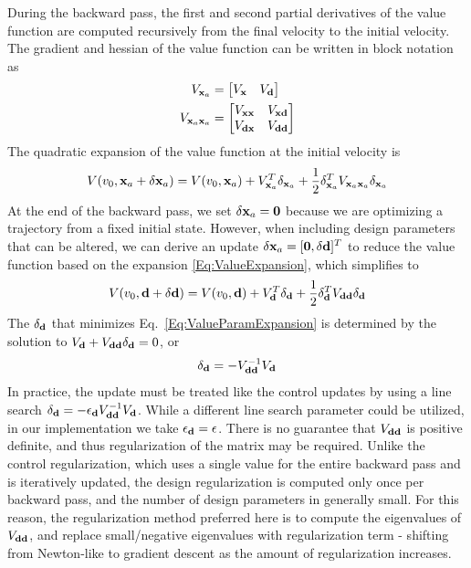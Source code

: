 During the backward pass, the first and second partial derivatives of the value function are computed recursively from the final velocity to the initial velocity. The gradient and hessian of the value function can be written in block notation as 
\begin{align}
	V_{\mathbf{x}_a} &= \begin{bmatrix}
		V_{\mathbf{x}} & V_{\mathbf{d}}
	\end{bmatrix} \\
	V_{\mathbf{x}_a\mathbf{x}_a} &= \begin{bmatrix}
		V_{\mathbf{x}\mathbf{x}} & V_{\mathbf{x}\mathbf{d}} \\
		V_{\mathbf{d}\mathbf{x}} & V_{\mathbf{d}\mathbf{d}}
	\end{bmatrix}
\end{align}
The quadratic expansion of the value function at the initial velocity is
\begin{align}
	V(v_0, \mathbf{x}_a+\delta\mathbf{x}_a) = V(v_0, \mathbf{x}_a) + V_{\mathbf{x}_a}^T\delta_{\mathbf{x}_a} + \frac{1}{2}\delta_{\mathbf{x}_a}^TV_{\mathbf{x}_a\mathbf{x}_a}\delta_{\mathbf{x}_a} \label{Eq:ValueExpansion}
\end{align}
At the end of the backward pass, we set $\delta\mathbf{x}_a=\mathbf{0}$ because we are optimizing a trajectory from a fixed initial state. However, when including design parameters that can be altered, we can derive an update $\delta\mathbf{x}_a = [\mathbf{0},\delta\mathbf{d}]^T$ to reduce the value function based on the expansion \eqref{Eq:ValueExpansion}, which simplifies to 
\begin{align}
	V(v_0, \mathbf{d}+\delta\mathbf{d}) = V(v_0, \mathbf{d}) + V_{\mathbf{d}}^T\delta_{\mathbf{d}} + \frac{1}{2}\delta_{\mathbf{d}}^TV_{\mathbf{d}\mathbf{d}}\delta_{\mathbf{d}} \label{Eq:ValueParamExpansion}
\end{align}
The $\delta_{\mathbf{d}}$ that minimizes Eq.~\eqref{Eq:ValueParamExpansion} is determined by the solution to $V_{\mathbf{d}} + V_{\mathbf{d}\mathbf{d}}\delta_{\mathbf{d}} = 0$, or 
\begin{align}
	\delta_{\mathbf{d}} = -V_{\mathbf{d}\mathbf{d}}^{-1}V_{\mathbf{d}}
\end{align}
In practice, the update must be treated like the control updates by using a line search $\delta_{\mathbf{d}} = -\epsilon_{\mathbf{d}} V_{\mathbf{d}\mathbf{d}}^{-1}V_{\mathbf{d}}$. While a different line search parameter could be utilized, in our implementation we take $\epsilon_{\mathbf{d}}=\epsilon$. There is no guarantee that $V_{\mathbf{d}\mathbf{d}}$ is positive definite, and thus regularization of the matrix may be required. Unlike the control regularization, which uses a single value for the entire backward pass and is iteratively updated, the design regularization is computed only once per backward pass, and the number of design parameters in generally small. For this reason, the regularization method preferred here is to compute the eigenvalues of $V_{\mathbf{d}\mathbf{d}}$, and replace small/negative eigenvalues with regularization term - shifting from Newton-like to gradient descent as the amount of regularization increases.

